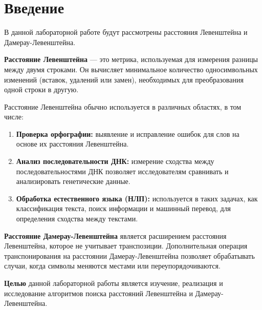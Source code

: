 \chapter*{Введение}

В данной лабораторной работе будут рассмотрены расстояния Левенштейна и Дамерау-Левенштейна. 

\textbf{Расстояние Левенштейна} — это метрика, используемая для измерения разницы между двумя строками. Он вычисляет минимальное количество односимвольных изменений (вставок, удалений или замен), необходимых для преобразования одной строки в другую.

Расстояние Левенштейна обычно используется в различных областях, в том числе:
\begin{enumerate}
    \item \textbf{Проверка орфографии:} выявление и исправление ошибок для слов на основе их расстояния Левенштейна.
    \item \textbf{Анализ последовательности ДНК:} измерение сходства между последовательностями ДНК позволяет исследователям сравнивать и анализировать генетические данные.
    \item \textbf{Обработка естественного языка (НЛП):} используется в таких задачах, как классификация текста, поиск информации и машинный перевод, для определения сходства между текстами.
\end{enumerate}

\textbf{Расстояние Дамерау-Левенштейна} является расширением расстояния Левенштейна, которое не учитывает транспозиции. Дополнительная операция транспонирования на расстоянии Дамерау-Левенштейна позволяет обрабатывать случаи, когда символы меняются местами или переупорядочиваются.

\textbf{Целью} данной лабораторной работы является изучение, реализация и исследование алгоритмов поиска расстояний Левенштейна и Дамерау-Левенштейна.


